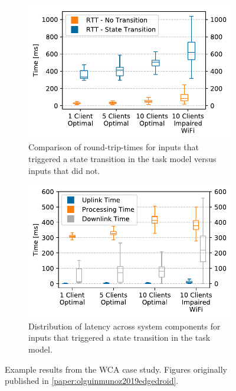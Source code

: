 \begin{figure}
    \begin{subfigure}[t]{.45\textwidth}
        \centering%
        \includegraphics[width=\textwidth]{publications/2019EdgeDroid/plots/comparison/nofonts/rtt_fb_vs_nofb}%
        \caption{
            Comparison of round-trip-times for inputs that triggered a state transition in the task model versus inputs that did not.
        }\label{fig:wca:rtt}%
    \end{subfigure}%
    \hfill%
    \begin{subfigure}[t]{.45\textwidth}
        \centering%
        \includegraphics[width=\textwidth]{publications/2019EdgeDroid/plots/comparison/nofonts/box_feedback}%
        \caption{%
            Distribution of latency across system components for inputs that triggered a state transition in the task model.
        }\label{fig:wca:latency}
    \end{subfigure}%
    \caption{
        Example results from the \acs{WCA} case study.
        Figures originally published in \cref{paper:olguinmunoz2019edgedroid}.
    }
\end{figure}

